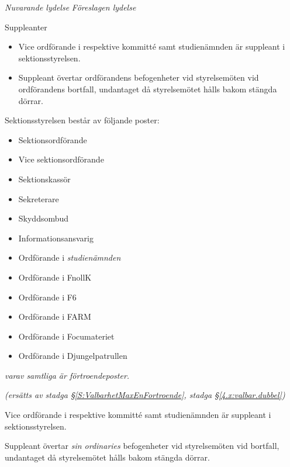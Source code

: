\documentclass{article}
\newenvironment{lydelse}
    {\begin{paracol}{2}%
        \emph{Nuvarande lydelse}%
        \switchcolumn%
        \emph{Föreslagen lydelse}%
    \end{paracol}%
    \begin{enumerate}[label=\thesubsection.\arabic*]%
    \begin{paracol}{2}%
    }{\end{paracol}\end{enumerate}}
\begin{document}
\begin{lydelse}
	\item Suppleanter
	\label{R:StyretViceSuppleant}
	\begin{itemize}
		\item Vice ordförande i respektive kommitté samt studienämnden är suppleant i sektionsstyrelsen.
		\item Suppleant övertar ordförandens befogenheter vid styrelsemöten vid ordförandens bortfall, undantaget då styrelsemötet hålls bakom stängda dörrar.
	\end{itemize}
	
    \setcounter{section}{3}
    \switchcolumn
    
    \item Sektionsstyrelsen består av följande poster:
    \begin{itemize}
        \item Sektionsordförande
    	\item Vice sektionsordförande
    	\item Sektionskassör
    	\item Sekreterare
    	\item Skyddsombud
    	\item Informationsansvarig
    	\item Ordförande i \emph{studienämnden}
    	\item Ordförande i FnollK
    	\item Ordförande i F6
    	\item Ordförande i FARM
    	\item Ordförande i Focumateriet
    	\item Ordförande i Djungelpatrullen
    \end{itemize}
    \emph{varav samtliga är förtroendeposter.}
    
    \vspace{0.4em}
    \item[] \emph{(ersätts av stadga \S \ref{S:ValbarhetMaxEnFortroende}, stadga \S \ref{4.x:valbar.dubbel})}
    
    \item[]
    \item[]
    \item[]
    \item[]
    \item[]
    
    \vspace{3ex}
    \item Vice ordförande i respektive kommitté samt studienämnden är suppleant i sektionsstyrelsen.
    
    \vspace{1.2em}
    \item Suppleant övertar \emph{sin ordinaries} befogenheter vid styrelsemöten vid bortfall, undantaget då styrelsemötet hålls bakom stängda dörrar.
\end{lydelse}
\end{document}
